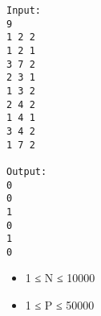 \begin{verbatim}
Input:
9
1 2 2 
1 2 1
3 7 2
2 3 1
1 3 2
2 4 2
1 4 1
3 4 2
1 7 2

Output:
0
0
1
0
1
0
\end{verbatim}
\begin{itemize}
	\item     1 ≤ N ≤ 10000   
	\item     1 ≤ P ≤ 50000   
\end{itemize}